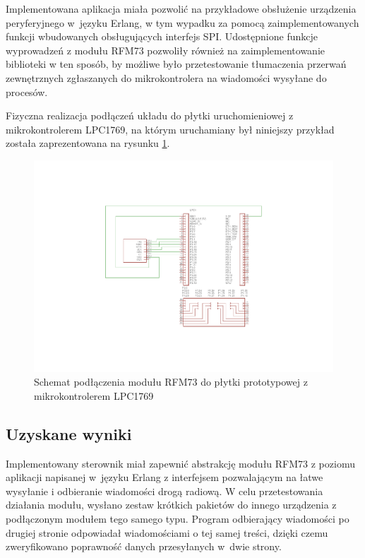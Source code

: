 Implementowana aplikacja miała pozwolić na przykładowe obsłużenie urządzenia peryferyjnego w~języku Erlang, w tym wypadku za pomocą zaimplementowanych funkcji wbudowanych obsługujących interfejs SPI.
Udostępnione funkcje wyprowadzeń z modułu RFM73 pozwoliły również na zaimplementowanie biblioteki w ten sposób, by możliwe było przetestowanie tłumaczenia przerwań zewnętrznych zgłaszanych do mikrokontrolera na wiadomości wysyłane do procesów.

Fizyczna realizacja podłączeń układu do płytki uruchomieniowej z mikrokontrolerem LPC1769, na którym uruchamiany był niniejszy przykład została zaprezentowana na rysunku \ref{fig:examplerfm}.

\begin{figure}[h]
\centerline{\includegraphics[scale=1, clip, trim=0 40mm 0 40mm]{example_rfm}}
\caption{Schemat podłączenia modułu RFM73 do płytki prototypowej z mikrokontrolerem LPC1769}
\label{fig:examplerfm}
\end{figure}


\subsection{Uzyskane wyniki}

Implementowany sterownik miał zapewnić abstrakcję modułu RFM73 z poziomu aplikacji napisanej w~języku Erlang z interfejsem pozwalającym na łatwe wysyłanie i odbieranie wiadomości drogą radiową. W celu przetestowania działania modułu, wysłano zestaw krótkich pakietów do innego urządzenia z podłączonym modułem tego samego typu. Program odbierający wiadomości po drugiej stronie odpowiadał wiadomościami o tej samej treści, dzięki czemu zweryfikowano poprawność danych przesyłanych w~dwie strony.

